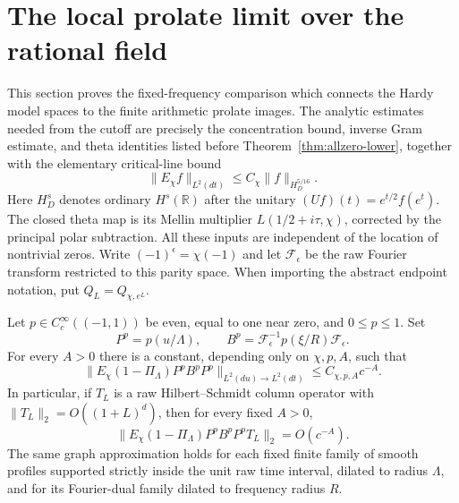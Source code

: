 \section{The local prolate limit over the rational field}

This section proves the fixed-frequency comparison which connects the
Hardy model spaces to the finite arithmetic prolate images.
The analytic estimates needed from the cutoff are precisely the
concentration bound, inverse Gram estimate, and theta identities
listed before Theorem~\ref{thm:allzero-lower}, together with the
elementary critical-line bound
\begin{equation}\label{eq:local-theta-graph}
 \|E_\chi f\|_{L^2(dt)}\leq C_\chi\|f\|_{H_D^{5/16}}.
\end{equation}
Here $H_D^s$ denotes ordinary $H^s(\mathbb R)$ after the unitary
$(Uf)(t)=e^{t/2}f(e^t)$.  The closed theta map is its Mellin multiplier
$L(1/2+i\tau,\chi)$, corrected by the principal polar subtraction.
All these inputs are independent of the location of nontrivial zeros.
Write $(-1)^\epsilon=\chi(-1)$ and let $\mathcal F_\epsilon$
be the raw Fourier transform restricted to this parity space.
When importing the abstract endpoint notation, put
$Q_L=Q_{\chi,e^L}$.

\begin{lemma}\label{lem:local-prolate-interior}
Let $p\in C_c^\infty((-1,1))$ be even, equal to one near zero, and
$0\leq p\leq1$. Set
\[
 P^p=p(u/\Lambda),\qquad
 B^p=\mathcal F_\epsilon^{-1}p(\xi/R)\mathcal F_\epsilon.
\]
For every $A>0$ there is a constant, depending only on
$\chi,p,A$, such that
\[
 \|E_\chi(1-\Pi_\Lambda)P^pB^pP^p\|_{L^2(du)\to L^2(dt)}
                                    \leq C_{\chi,p,A}c^{-A}.
\]
In particular, if $T_L$ is a raw Hilbert--Schmidt column operator with
$\|T_L\|_2=O((1+L)^d)$, then for every fixed $A>0$,
\[
 \|E_\chi(1-\Pi_\Lambda)P^pB^pP^pT_L\|_2=O(c^{-A}).
\]
The same graph approximation holds for each fixed finite family of
smooth profiles supported strictly inside the unit raw time interval,
dilated to radius $\Lambda$, and for its Fourier-dual family dilated
to frequency radius $R$.
\end{lemma}

